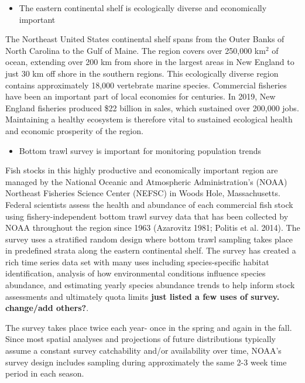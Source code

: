 \documentclass[
  12pt,
]{article}
\providecommand{\tightlist}{%
  \setlength{\itemsep}{0pt}\setlength{\parskip}{0pt}}
\begin{document}
\begin{itemize}
\tightlist
\item
  The eastern continental shelf is ecologically diverse and economically important
\end{itemize}

The Northeast United States continental shelf spans from the Outer Banks of North Carolina to the Gulf of Maine. The region covers over 250,000 km\(^2\) of ocean, extending over 200 km from shore in the largest areas in New England to just 30 km off shore in the southern regions. This ecologically diverse region contains approximately 18,000 vertebrate marine species. Commercial fisheries have been an important part of local economies for centuries. In 2019, New England fisheries produced \$22 billion in sales, which sustained over 200,000 jobs. Maintaining a healthy ecosystem is therefore vital to sustained ecological health and economic prosperity of the region.

\begin{itemize}
\tightlist
\item
  Bottom trawl survey is important for monitoring population trends
\end{itemize}

Fish stocks in this highly productive and economically important region are managed by the National Oceanic and Atmospheric Administration's (NOAA) Northeast Fisheries Science Center (NEFSC) in Woods Hole, Massachusetts. Federal scientists assess the health and abundance of each commercial fish stock using fishery-independent bottom trawl survey data that has been collected by NOAA throughout the region since 1963 (Azarovitz 1981; Politis et al. 2014). The survey uses a stratified random design where bottom trawl sampling takes place in predefined strata along the eastern continental shelf. The survey has created a rich time series data set with many uses including species-specific habitat identification, analysis of how environmental conditions influence species abundance, and estimating yearly species abundance trends to help inform stock assessments and ultimately quota limits \textbf{just listed a few uses of survey. change/add others?}.

The survey takes place twice each year- once in the spring and again in the fall. Since most spatial analyses and projections of future distributions typically assume a constant survey catchability and/or availability over time, NOAA's survey design includes sampling during approximately the same 2-3 week time period in each season.
\end{document}
